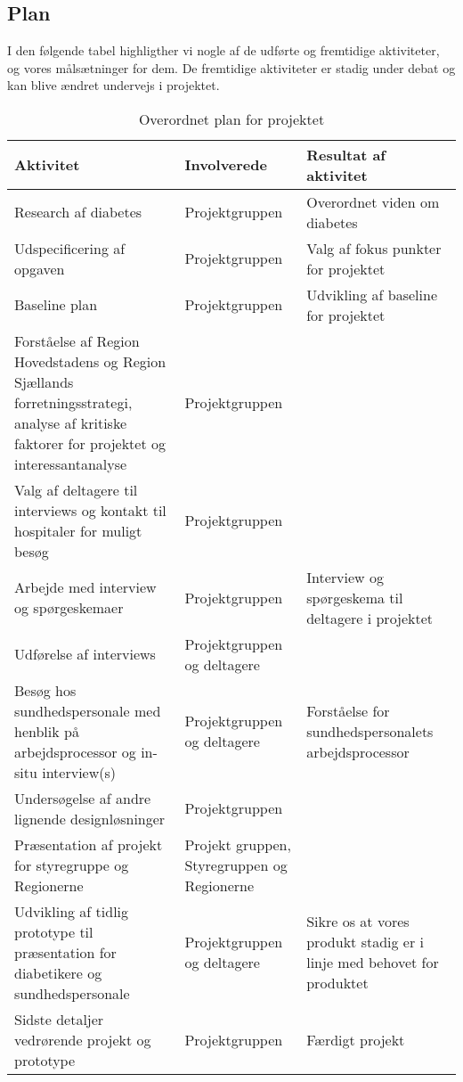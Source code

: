 \newpage
\subsection{Plan}
I den følgende tabel highligther vi nogle af de udførte og fremtidige aktiviteter, og vores målsætninger for dem. De fremtidige aktiviteter er stadig under debat og kan blive ændret undervejs i projektet.
\begin{table}[h!]
	\centering
	\begin{tabularx}{\textwidth}{|X|M|X|}
		\hline
		Aktivitet&Involverede&Resultat af aktivitet\\
		\hline
		Research af diabetes & Projektgruppen & Overordnet viden om diabetes\\
		\hline
		Udspecificering af opgaven & Projektgruppen & Valg af fokus punkter for projektet\\
		\hline
		Baseline plan & Projektgruppen & Udvikling af baseline for projektet\\
		\hline
		Forståelse af Region Hovedstadens og Region Sjællands forretningsstrategi, analyse af kritiske faktorer for projektet og interessantanalyse & Projektgruppen & \\
		\hline
		Valg af deltagere til interviews og kontakt til hospitaler for muligt besøg & Projektgruppen & \\
		\hline
		Arbejde med interview og spørgeskemaer & Projektgruppen & Interview og spørgeskema til deltagere i projektet\\
		\hline
		Udførelse af interviews & Projektgruppen og deltagere & \\
		\hline
		Besøg hos sundhedspersonale med henblik på arbejdsprocessor og in-situ interview(s) & Projektgruppen og deltagere & Forståelse for sundhedspersonalets arbejdsprocessor\\
		\hline
		Undersøgelse af andre lignende designløsninger & Projektgruppen & \\
		\hline
		Præsentation af projekt for styregruppe og Regionerne & Projekt gruppen, Styregruppen og Regionerne & \\
		\hline
		Udvikling af tidlig prototype til præsentation for diabetikere og sundhedspersonale & Projektgruppen og deltagere & Sikre os at vores produkt stadig er i linje med behovet for produktet\\
		\hline
		Sidste detaljer vedrørende projekt og prototype & Projektgruppen & Færdigt projekt\\
		\hline
	\end{tabularx}
	\caption{Overordnet plan for projektet}
\end{table}
